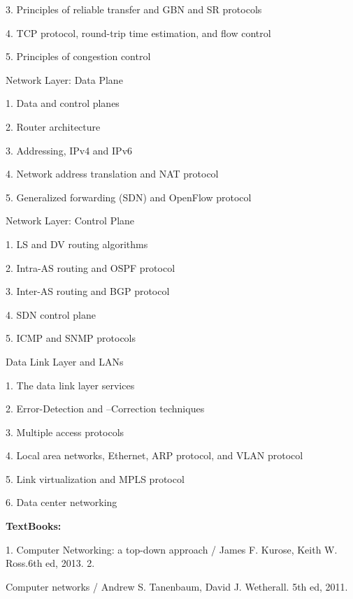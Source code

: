 \documentclass[12pt,a4paper]{article}
\begin{document}
3. Principles of reliable transfer and GBN and SR protocols\par
4. TCP protocol, round-trip time estimation, and flow control\par
5. Principles of congestion control\par
Network Layer: Data Plane\par
1. Data and control planes\par
2. Router architecture\par
3. Addressing, IPv4 and IPv6\par
4. Network address translation and NAT protocol\par
5. Generalized forwarding (SDN) and OpenFlow protocol\par
Network Layer: Control Plane\par
1. LS and DV routing algorithms\par
2. Intra-AS routing and OSPF protocol\par
3. Inter-AS routing and BGP protocol\par
4. SDN control plane\par
5. ICMP and SNMP protocols\par
Data Link Layer and LANs\par
1. The data link layer services\par
2. Error-Detection and –Correction techniques\par
3. Multiple access protocols\par
4. Local area networks, Ethernet, ARP protocol, and VLAN protocol\par
5. Link virtualization and MPLS protocol\par
6. Data center networking\par\vspace{4pt}
\textbf{TextBooks:}\par\vspace{2pt}
1. Computer Networking: a top-down approach / James F. Kurose, Keith W. Ross.6th ed, 2013. 2.\par
Computer networks / Andrew S. Tanenbaum, David J. Wetherall. 5th ed, 2011.\par
\vspace{4pt}
\end{document}
